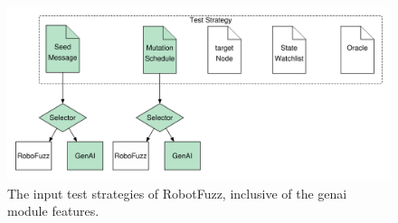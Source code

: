 \begin{figure}[ht!]
    \centerline{
    \includegraphics[width=0.7\linewidth]{ ./figures/data/Test_Strategy.pdf}}
    \caption{The input test strategies of RobotFuzz, inclusive of the genai module features.}
    \label{fig:genai-robofuzz_test_strategy}
\end{figure}